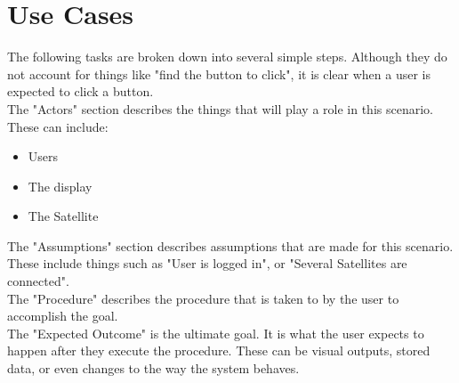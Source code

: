 
\chapter{Use Cases}

The following tasks are broken down into several simple steps. 
Although they do not account for things like "find the button to click", 
it is clear when a user is expected to click a button.\\

The "Actors" section describes the things that will play a role in this scenario. 
These can include:
\begin{itemize}
	\item Users
	\item The display
	\item The Satellite
\end{itemize}

The "Assumptions" section describes assumptions that are made for this scenario. 
These include things such as "User is logged in", or "Several Satellites are connected".\\

The "Procedure" describes the procedure that is taken to by the user to accomplish the goal. \\

The "Expected Outcome" is the ultimate goal. 
It is what the user expects to happen after they execute the procedure. 
These can be visual outputs, stored data, or even changes to the way the system behaves.


